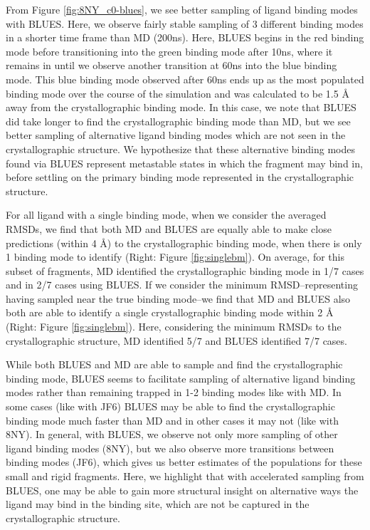From Figure \ref{fig:8NY_c0-blues}, we see better sampling of ligand binding modes with BLUES.
Here, we observe fairly stable sampling of 3 different binding modes in a shorter time frame than MD (200ns).
Here, BLUES begins in the red binding mode before transitioning into the green binding mode after 10ns, where it remains in until we observe another transition at 60ns into the blue binding mode.
This blue binding mode observed after 60ns ends up as the most populated binding mode over the course of the simulation and was calculated to be 1.5 {\AA} away from the crystallographic binding mode.
In this case, we note that BLUES did take longer to find the crystallographic binding mode than MD, but we see better sampling of alternative ligand binding modes which are not seen in the crystallographic structure.
We hypothesize that these alternative binding modes found via BLUES represent metastable states in which the fragment may bind in, before settling on the primary binding mode represented in the crystallographic structure.

For all ligand with a single binding mode, when we consider the averaged RMSDs, we find that both MD and BLUES are equally able to make close predictions (within 4 {\AA}) to the crystallographic binding mode, when there is only 1 binding mode to identify (Right: Figure \ref{fig:singlebm}).
On average, for this subset of fragments, MD identified the crystallographic binding mode in 1/7 cases and in 2/7 cases using BLUES.
If we consider the minimum RMSD--representing having sampled near the true binding mode--we find that MD and BLUES also both are able to identify a single crystallographic binding mode within 2 {\AA} (Right: Figure \ref{fig:singlebm}).
Here, considering the minimum RMSDs to the crystallographic structure, MD identified 5/7 and BLUES identified 7/7 cases.

While both BLUES and MD are able to sample and find the crystallographic binding mode, BLUES seems to facilitate sampling of alternative ligand binding modes rather than remaining trapped in 1-2 binding modes like with MD.
In some cases (like with JF6) BLUES may be able to find the crystallographic binding mode much faster than MD and in other cases it may not (like with 8NY).
In general, with BLUES, we observe not only more sampling of other ligand binding modes (8NY), but we also observe more transitions between binding modes (JF6), which gives us better estimates of the populations for these small and rigid fragments.
Here, we highlight that with accelerated sampling from BLUES, one may be able to gain more structural insight on alternative ways the ligand may bind in the binding site, which are not be captured in the crystallographic structure.

